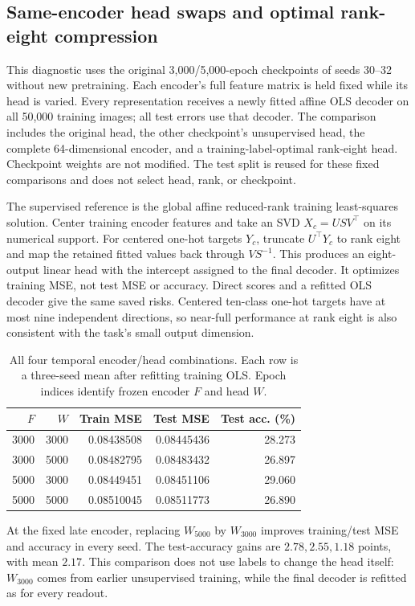 \subsection{Same-encoder head swaps and optimal rank-eight compression}
This diagnostic uses the original 3,000/5,000-epoch checkpoints of seeds 30--32 without new pretraining. Each encoder's full feature matrix is held fixed while its head is varied. Every representation receives a newly fitted affine OLS decoder on all 50,000 training images; all test errors use that decoder. The comparison includes the original head, the other checkpoint's unsupervised head, the complete 64-dimensional encoder, and a training-label-optimal rank-eight head. Checkpoint weights are not modified. The test split is reused for these fixed comparisons and does not select head, rank, or checkpoint.

The supervised reference is the global affine reduced-rank training least-squares solution. Center training encoder features and take an SVD $X_c=USV^\top$ on its numerical support. For centered one-hot targets $Y_c$, truncate $U^\top Y_c$ to rank eight and map the retained fitted values back through $VS^{-1}$. This produces an eight-output linear head with the intercept assigned to the final decoder. It optimizes training MSE, not test MSE or accuracy. Direct scores and a refitted OLS decoder give the same saved risks. Centered ten-class one-hot targets have at most nine independent directions, so near-full performance at rank eight is also consistent with the task's small output dimension.

\begin{table}[t]
\centering\small
\caption{All four temporal encoder/head combinations. Each row is a three-seed mean after refitting training OLS. Epoch indices identify frozen encoder $F$ and head $W$.}
\label{supp:followup-crossed-heads}
\setlength{\tabcolsep}{3pt}
\begin{tabular}{rrrrr}
\toprule
$F$&$W$&Train MSE&Test MSE&Test acc. (\%)\\\midrule
3000&3000&0.08438508&0.08445436&28.273\\
3000&5000&0.08482795&0.08483432&26.897\\
5000&3000&0.08449451&0.08451106&29.060\\
5000&5000&0.08510045&0.08511773&26.890\\\bottomrule
\end{tabular}
\end{table}

At the fixed late encoder, replacing $W_{5000}$ by $W_{3000}$ improves training/test MSE and accuracy in every seed. The test-accuracy gains are $2.78,2.55,1.18$ points, with mean $2.17$. This comparison does not use labels to change the head itself: $W_{3000}$ comes from earlier unsupervised training, while the final decoder is refitted as for every readout.

